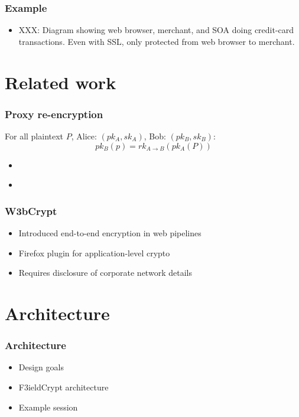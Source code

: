 \documentclass{beamer}
\begin{document}
\begin{frame}
\frametitle{Example}
\begin{itemize}
\item XXX: Diagram showing web browser, merchant, and SOA doing credit-card
transactions.  Even with SSL, only protected from web browser to merchant.
\end{itemize}
\end{frame}

\section{Related work}


\begin{frame}
\frametitle{Proxy re-encryption}
For all plaintext $P$, Alice: $(pk_A, sk_A)$, Bob: $(pk_B, sk_B)$:
\begin{equation*}
pk_B(p) = rk_{A \to B}( pk_A (P))
\end{equation*}
\begin{itemize}
\item \cite{atomic_proxy_reencryption} 
\item \cite{proxy_reencryption}
\end{itemize}
\end{frame}

\begin{frame}
\frametitle{W3bCrypt}
\begin{itemize}
\item Introduced end-to-end encryption in web pipelines
\item Firefox plugin for application-level crypto
\item Requires disclosure of corporate network details
\end{itemize}
\end{frame}

\section{Architecture}
\begin{frame}
\frametitle{Architecture}
\begin{itemize}
\item Design goals
\item F3ieldCrypt architecture
\item Example session
\end{itemize}
\end{frame}
\end{document}
